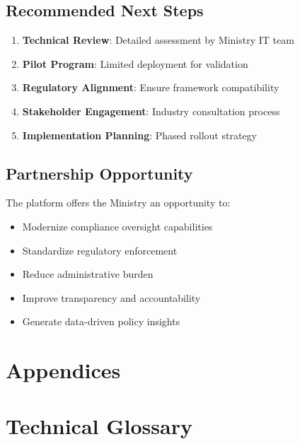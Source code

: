 \documentclass[11pt,a4paper]{article}
\begin{document}
\subsection{Recommended Next Steps}

\begin{keypoint}
\begin{enumerate}
    \item \textbf{Technical Review}: Detailed assessment by Ministry IT team
    \item \textbf{Pilot Program}: Limited deployment for validation
    \item \textbf{Regulatory Alignment}: Ensure framework compatibility
    \item \textbf{Stakeholder Engagement}: Industry consultation process
    \item \textbf{Implementation Planning}: Phased rollout strategy
\end{enumerate}
\end{keypoint}

\subsection{Partnership Opportunity}

The platform offers the Ministry an opportunity to:
\begin{itemize}
    \item Modernize compliance oversight capabilities
    \item Standardize regulatory enforcement
    \item Reduce administrative burden
    \item Improve transparency and accountability
    \item Generate data-driven policy insights
\end{itemize}

\section*{Appendices}

\appendix

\section{Technical Glossary}
\end{document}
